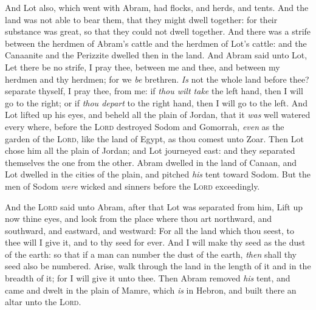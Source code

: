 \documentclass[11pt,letterpaper,oneside]{memoir}
\begin{document}
And Lot also, which went with Abram, had flocks, and herds, and tents.
And the land was not able to bear them, that they might dwell together:
for their substance was great, so that they could not dwell together.
And there was a strife between the herdmen of Abram's cattle and the
herdmen of Lot's cattle: and the Canaanite and the Perizzite dwelled
then in the land. And Abram said unto Lot, Let there be no strife, I
pray thee, between me and thee, and between my herdmen and thy herdmen;
for we \emph{be} brethren. \emph{Is} not the whole land before thee?
separate thyself, I pray thee, from me: if \emph{thou wilt take} the
left hand, then I will go to the right; or if \emph{thou depart} to the
right hand, then I will go to the left. And Lot lifted up his eyes, and
beheld all the plain of Jordan, that it \emph{was} well watered every
where, before the \textsc{Lord} destroyed Sodom and Gomorrah, \emph{even}
as the garden of the \textsc{Lord}, like the land of Egypt, as thou comest
unto Zoar. Then Lot chose him all the plain of Jordan; and Lot journeyed
east: and they separated themselves the one from the other. Abram
dwelled in the land of Canaan, and Lot dwelled in the cities of the
plain, and pitched \emph{his} tent toward Sodom. But the men of Sodom
\emph{were} wicked and sinners before the \textsc{Lord} exceedingly.

And the \textsc{Lord} said unto Abram, after that Lot was separated from
him, Lift up now thine eyes, and look from the place where thou art
northward, and southward, and eastward, and westward: For all the land
which thou seest, to thee will I give it, and to thy seed for ever. And
I will make thy seed as the dust of the earth: so that if a man can
number the dust of the earth, \emph{then} shall thy seed also be
numbered. Arise, walk through the land in the length of it and in the
breadth of it; for I will give it unto thee. Then Abram removed
\emph{his} tent, and came and dwelt in the plain of Mamre, which
\emph{is} in Hebron, and built there an altar unto the \textsc{Lord}.
\end{document}
